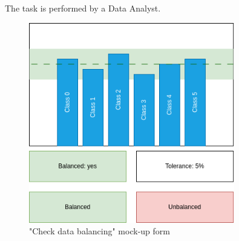 The task is performed by a Data Analyst.

\begin{figure}[H]
\centering
\includegraphics[width=0.8\textwidth]{figures/check_data_balancing.png}
\caption{"Check data balancing" mock-up form}
\end{figure}

